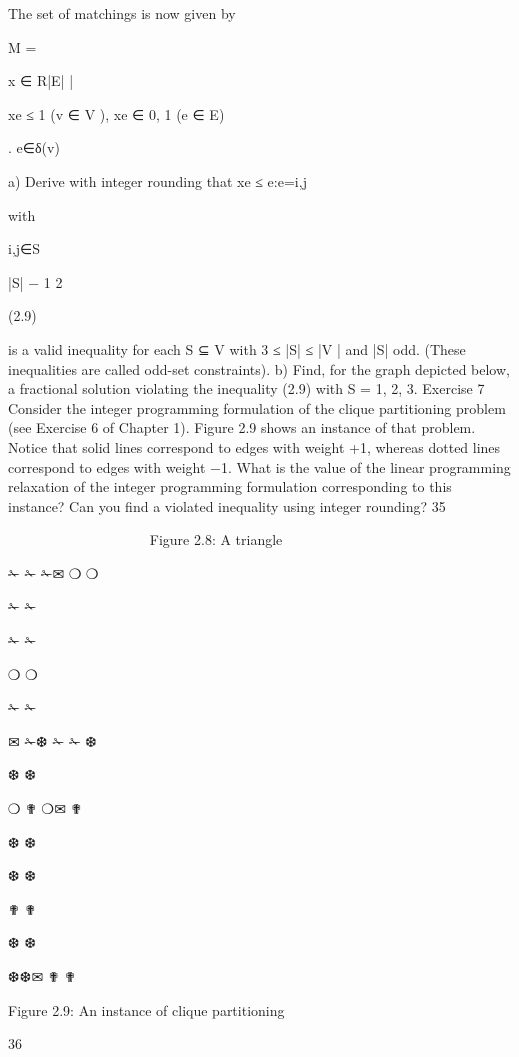 \documentclass[titlepage]{book}
\theoremstyle{definition}
\begin{document}
The set of matchings is now given by

M = {x ∈ R|E| |

xe ≤ 1 (v ∈ V ), xe ∈ {0, 1} (e ∈ E)}.
e∈δ(v)

a) Derive with integer rounding that
xe ≤
e:e={i,j}

with

i,j∈S

|S| − 1
2

(2.9)

is a valid inequality for each S ⊆ V with 3 ≤ |S| ≤ |V | and |S| odd. (These inequalities are called
odd-set constraints).
b) Find, for the graph depicted below, a fractional solution violating the inequality (2.9) with S =
{1, 2, 3}.
Exercise 7
Consider the integer programming formulation of the clique partitioning problem (see Exercise 6 of
Chapter 1). Figure 2.9 shows an instance of that problem. Notice that solid lines correspond to edges
with weight +1, whereas dotted lines correspond to edges with weight −1. What is the value of the linear
programming relaxation of the integer programming formulation corresponding to this instance? Can
you find a violated inequality using integer rounding?
35

✉
 ❅
 
❅
 
❅
 
❅
 
❅
✉
 
❅✉
Figure 2.8: A triangle

✁
✁
✁✉
❍
❍

✁
✁

✁
✁

❍
❍

✁
✁

✉
✁❆
✁
✁ ❆

❆
❆

❍
✟
❍✉
✟

❆
❆

❆
❆

✟
✟

❆
❆

❆❆✉
✟
✟

Figure 2.9: An instance of clique partitioning

36



\end{document}
